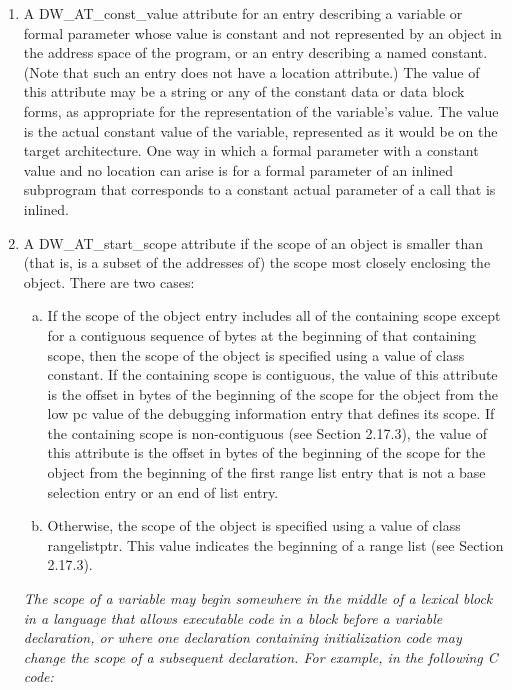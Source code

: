 \begin{enumerate}[1.]
\item A DW\_AT\_const\_value attribute for an entry describing a
variable or formal parameter whose value is constant and not
represented by an object in the address space of the program,
or an entry describing a named constant. (Note that such
an entry does not have a location attribute.) The value of
this attribute may be a string or any of the constant data
or data block forms, as appropriate for the representation
of the variable’s value. The value is the actual constant
value of the variable, represented as it would be on the
target architecture.  One way in which a formal parameter
with a constant value and no location can arise is for a
formal parameter of an inlined subprogram that corresponds
to a constant actual parameter of a call that is inlined.

\item A DW\_AT\_start\_scope attribute if the scope of an
object is smaller than (that is, is a subset of the addresses
of) the scope most closely enclosing the object. There are
two cases:
\begin{enumerate}[a)]
\item If the scope of the object entry includes all of the
containing scope except for a contiguous sequence of bytes at
the beginning of that containing scope, then the scope of the
object is specified using a value of class constant. If the
containing scope is contiguous, the value of this attribute
is the offset in bytes of the beginning of the scope for the
object from the low pc value of the debugging information
entry that defines its scope. If the containing scope
is non-contiguous (see Section 2.17.3), the value of this
attribute is the offset in bytes of the beginning of the scope
for the object from the beginning of the first range list entry
that is not a base selection entry or an end of list entry.

\item Otherwise, the scope of the object is specified using
a value of class rangelistptr. This value indicates the
beginning of a range list (see Section 2.17.3).
\end{enumerate}


\textit{The scope of a variable may begin somewhere in the middle of
a lexical block in a language that allows executable code in a
block before a variable declaration, or where one declaration
containing initialization code may change the scope of a
subsequent declaration.  For example, in the following C code:}


\end{enumerate}
